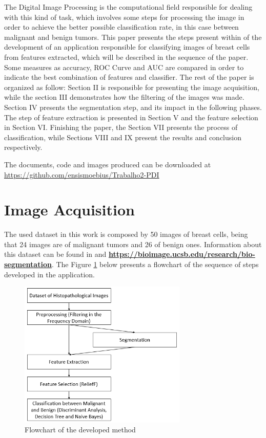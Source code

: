\documentclass[conference]{IEEEtran}
\begin{document}
		\par The Digital Image Processing is the computational field responsible for dealing with this kind of task, which involves some steps for processing the image in order to achieve the better possible classification rate, in this case between malignant and benign tumors. This paper presents the steps present within of the development of an application responsible for classifying images of breast cells from features extracted, which will be described in the sequence of the paper. Some measures as accuracy, ROC Curve and AUC are compared in order to indicate the best combination of features and classifier. The rest of the paper is organized as follow:  Section II is responsible for presenting the image acquisition, while the section III demonstrates how the filtering of the images was made. Section IV presents the segmentation step, and its impact in the following phases. The step of feature extraction is presented in Section V and the feature selection in Section VI. Finishing the paper, the Section VII presents the process of classification, while Sections VIII and IX present the results and conclusion respectively.
		
		\par The documents, code and images produced can be downloaded at \url{https://github.com/ensismoebius/Trabalho2-PDI}

	\section{Image Acquisition}
		\par The used dataset in this work is composed by 50 images of breast cells, being that 24 images are of malignant tumors and 26 of benign ones. Information about this dataset can be found in \cite{artigo_database} and \href{https://bioimage.ucsb.edu/research/bio-segmentation}{\textbf{https://bioimage.ucsb.edu/research/bio-segmentation}}. The Figure \ref{fig:imagem3} below presents a flowchart of the sequence of steps developed in the application.
		
		\begin{figure}[h]
		    \centering
		    \includegraphics[width=8cm]{images/imagem3.png}
		    \caption{Flowchart of the developed method}
		    \label{fig:imagem3}
		\end{figure}
\end{document}
